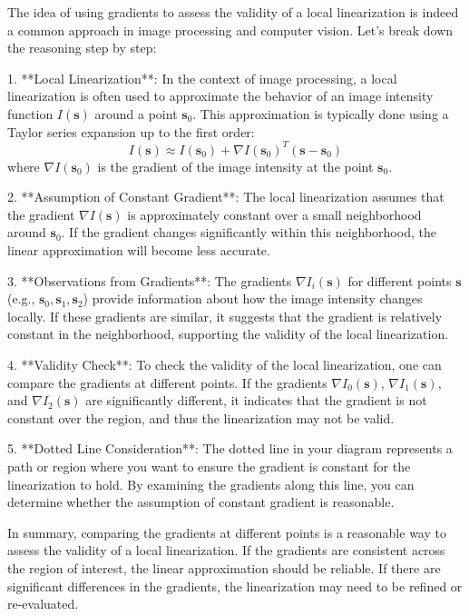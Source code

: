 The idea of using gradients to assess the validity of a local linearization is indeed a common approach in image processing and computer vision. Let's break down the reasoning step by step:

1. **Local Linearization**: In the context of image processing, a local linearization is often used to approximate the behavior of an image intensity function \( I(\mathbf{s}) \) around a point \(\mathbf{s}_0\). This approximation is typically done using a Taylor series expansion up to the first order:
   \[
   I(\mathbf{s}) \approx I(\mathbf{s}_0) + \nabla I(\mathbf{s}_0)^T (\mathbf{s} - \mathbf{s}_0)
   \]
   where \(\nabla I(\mathbf{s}_0)\) is the gradient of the image intensity at the point \(\mathbf{s}_0\).

2. **Assumption of Constant Gradient**: The local linearization assumes that the gradient \(\nabla I(\mathbf{s})\) is approximately constant over a small neighborhood around \(\mathbf{s}_0\). If the gradient changes significantly within this neighborhood, the linear approximation will become less accurate.

3. **Observations from Gradients**: The gradients \(\nabla I_i(\mathbf{s})\) for different points \(\mathbf{s}\) (e.g., \(\mathbf{s}_0, \mathbf{s}_1, \mathbf{s}_2\)) provide information about how the image intensity changes locally. If these gradients are similar, it suggests that the gradient is relatively constant in the neighborhood, supporting the validity of the local linearization.

4. **Validity Check**: To check the validity of the local linearization, one can compare the gradients at different points. If the gradients \(\nabla I_0(\mathbf{s})\), \(\nabla I_1(\mathbf{s})\), and \(\nabla I_2(\mathbf{s})\) are significantly different, it indicates that the gradient is not constant over the region, and thus the linearization may not be valid.

5. **Dotted Line Consideration**: The dotted line in your diagram represents a path or region where you want to ensure the gradient is constant for the linearization to hold. By examining the gradients along this line, you can determine whether the assumption of constant gradient is reasonable.

In summary, comparing the gradients at different points is a reasonable way to assess the validity of a local linearization. If the gradients are consistent across the region of interest, the linear approximation should be reliable. If there are significant differences in the gradients, the linearization may need to be refined or re-evaluated.